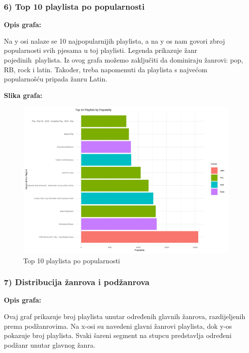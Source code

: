 	\subsubsection{6) Top 10 playlista po popularnosti}
	
	\textbf{Opis grafa:}
	
	Na y osi nalaze se 10 najpopularnijih playlista, a na y os nam govori zbroj popularnosti svih pjesama u toj playlisti. Legenda prikazuje žanr pojedinih playlista. 
	Iz ovog grafa možemo zaključiti da dominiraju žanrovi: pop, RB, rock i latin. Također, treba napomenuti da playlista s najvećom popularnošću pripada žanru Latin.
	
	\textbf{Slika grafa:}
	\begin{figure}[H]
		\includegraphics[scale=0.9]{slike/playlists_by_popularity.png}
		\centering
		\caption{Top 10 playlista po popularnosti}
		
	\end{figure}
	
		\subsubsection{7) Distribucija žanrova i podžanrova}
	
	\textbf{Opis grafa:}
	
		Ovaj graf prikazuje broj playlista unutar određenih glavnih žanrova, razdijeljenih prema podžanrovima. Na x-osi su navedeni glavni žanrovi playlista, dok y-os pokazuje broj playlista. Svaki šareni segment na stupcu predstavlja određeni podžanr unutar glavnog žanra.
		
